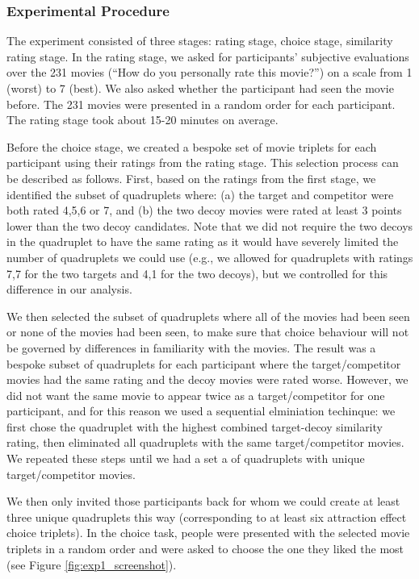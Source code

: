 \documentclass[12pt, a4paper]{article}
\begin{document}
\subsubsection{Experimental Procedure}

The experiment consisted of three stages: rating stage, choice stage, similarity rating stage. In the rating stage, we asked for participants' subjective evaluations over the 231 movies (``How do you personally rate this movie?'') on a scale from 1 (worst) to 7 (best). We also asked whether the participant had seen the movie before. The 231 movies were presented in a random order for each participant. The rating stage took about 15-20 minutes on average.

Before the choice stage, we created a bespoke set of movie triplets for each participant using their ratings from the rating stage. This selection process can be described as follows. First, based on the ratings from the first stage, we identified the subset of quadruplets where: (a) the target and competitor were both rated 4,5,6 or 7, and (b) the two decoy movies were rated at least 3 points lower than the two decoy candidates. Note that we did not require the two decoys in the quadruplet to have the same rating as it would have severely limited the number of quadruplets we could use (e.g., we allowed for quadruplets with ratings 7,7 for the two targets and 4,1 for the two decoys), but we controlled for this difference in our analysis.  
 
We then selected the subset of quadruplets where all of the movies had been seen or none of the movies had been seen, to make sure that choice behaviour will not be governed by differences in familiarity with the movies. The result was a bespoke subset of quadruplets for each participant where the target/competitor movies had the same rating and the decoy movies were rated worse. However, we did not want the same movie to appear twice as a target/competitor for one participant, and for this reason we used a sequential elminiation techinque: we first chose the quadruplet with the highest combined target-decoy similarity rating, then eliminated all quadruplets with the same target/competitor movies. We repeated these steps until we had a set a of quadruplets with unique target/competitor movies.  
 
  We then only invited those participants back for whom we could create at least three unique quadruplets this way (corresponding to at least six attraction effect choice triplets). In the choice task, people were presented with the selected movie triplets in a random order and were asked to choose the one they liked the most (see Figure \ref{fig:exp1_screenshot}). 
 
\end{document}
